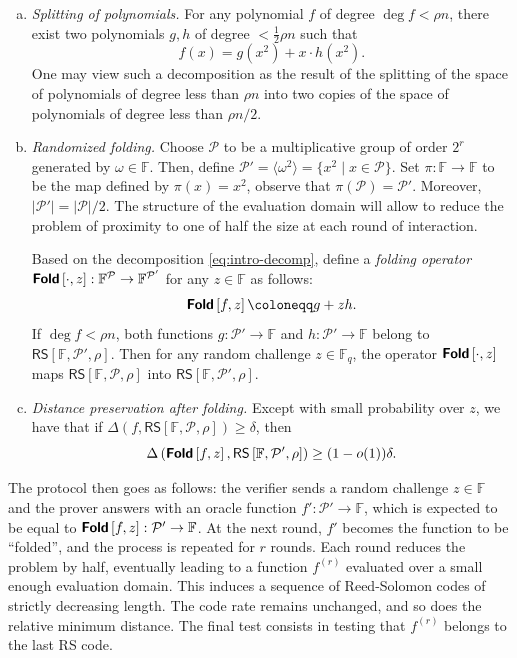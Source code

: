 \documentclass[a4paper,USenglish,autoref]{lipics-v2021}
\newcommand\F{\mathbb{F}}
\newcommand\Fq{\mathbb{F}_q}
\newcommand\fold[1]{\textsf{\textbf{Fold}}\left[#1\right]}
\newcommand\RS[1]{\mathsf{RS}\left[\F,#1\right]}
\newcommand{\size}[1]{\left|#1\right|}
\newcommand\calP{\mathcal{P}}
\newcommand\mydef{\coloneqq}
\begin{document}
\begin{enumerate}[a)]
	\item\label{it:split} \emph{Splitting of polynomials.} For any polynomial $f$ of degree $\deg f < \rho n$, there exist two polynomials $g,  h$ of degree $< \frac{1}{2} \rho n$ such that 
	\begin{equation}\label{eq:intro-decomp}
		f(x) = g\left(x^2\right) + x \cdot h\left(x^2\right).
	\end{equation}
	One may view such a decomposition as the result of the splitting of the space of polynomials of degree less than $\rho n$ into two copies of the space of polynomials of degree less than $\rho n/2$. 
	
	\item\label{it:fold} \emph{Randomized folding.}
	Choose $\calP$ to be a multiplicative group of order $2^r$ generated by $\omega \in \F$. Then, define $\calP' = \langle \omega^2 \rangle = \{x^2 \mid x \in \calP\}$. Set $\pi : \F \rightarrow \F$ to be the map defined by $\pi(x) = x^2$, observe that $\pi(\calP) = \calP'$. Moreover, $\size{\calP'} = \size{\calP}/2$. The structure of the evaluation domain will allow to reduce the problem of proximity to one of half the size at each round of interaction.
	
	Based on the decomposition \eqref{eq:intro-decomp}, define a \emph{folding operator} $\fold{\cdot,z} : \F^\calP \rightarrow \F^{\calP'}$ for any $z \in \F$ as follows:
	\[\fold{f,z} \mydef g + zh.\]
	If $\deg f < \rho n$, both functions $g : \calP' \rightarrow \F$ and $h : \calP' \rightarrow \F$ belong to $\RS{\calP', \rho}$. Then for any random challenge $z\in \Fq$, the operator $\fold{\cdot, z}$ maps $\RS{\calP,\rho}$ into $\RS{\calP',\rho}$.
	
	\item\label{it:dist} \emph{Distance preservation after folding.} Except with small probability over $z$, we have that if $\Delta(f, \RS{\calP, \rho}) \ge \delta$, then \[\Delta\left(\fold{f, z}, \RS{\calP', \rho}\right) \ge (1 - o(1))\delta.\]
\end{enumerate}

The protocol then goes as follows: the verifier sends a random challenge $z \in \F$ and the prover answers with an oracle function $f' : \calP' \rightarrow \F$, which is expected to be equal to $\fold{f,z} : \calP' \rightarrow \F$. At the next round, $f'$ becomes the function to be ``folded'', and the process is repeated for $r$ rounds. Each round reduces the problem by half, eventually leading to a function $f^{(r)}$ evaluated over a small enough evaluation domain. This induces a sequence of Reed-Solomon codes of strictly decreasing length. The code rate remains unchanged, and so does the relative minimum distance. The final test consists in testing that $f^{(r)}$ belongs to the last RS code. 
\end{document}
